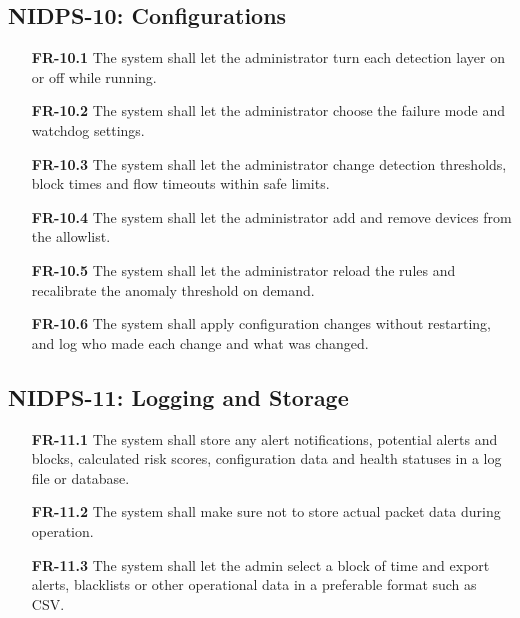 \subsection{NIDPS-10: Configurations}\label{sec:4.2.10}

\begin{itemize}[leftmargin=4.4em,labelwidth=3.9em,labelsep=0.5em,align=left]
\item[\hypertarget{req:FR-10.1}{\textbf{FR-10.1}}] The system shall let the administrator turn each detection layer on or off while running.
\item[\hypertarget{req:FR-10.2}{\textbf{FR-10.2}}] The system shall let the administrator choose the failure mode and watchdog settings.
\item[\hypertarget{req:FR-10.3}{\textbf{FR-10.3}}] The system shall let the administrator change detection thresholds, block times and flow timeouts within safe limits.
\item[\hypertarget{req:FR-10.4}{\textbf{FR-10.4}}] The system shall let the administrator add and remove devices from the allowlist.
\item[\hypertarget{req:FR-10.5}{\textbf{FR-10.5}}] The system shall let the administrator reload the rules and recalibrate the anomaly threshold on demand.
\item[\hypertarget{req:FR-10.6}{\textbf{FR-10.6}}] The system shall apply configuration changes without restarting, and log who made each change and what was changed.
\end{itemize}

\subsection{NIDPS-11: Logging and Storage}\label{sec:4.2.11}

\begin{itemize}[leftmargin=4.4em,labelwidth=3.9em,labelsep=0.5em,align=left]
\item[\hypertarget{req:FR-11.1}{\textbf{FR-11.1}}] The system shall store any alert notifications, potential alerts and blocks, calculated risk scores, configuration data and health statuses in a log file or database.
\item[\hypertarget{req:FR-11.2}{\textbf{FR-11.2}}] The system shall make sure not to store actual packet data during operation.
\item[\hypertarget{req:FR-11.3}{\textbf{FR-11.3}}] The system shall let the admin select a block of time and export alerts, blacklists or other operational data in a preferable format such as CSV.
\end{itemize}

